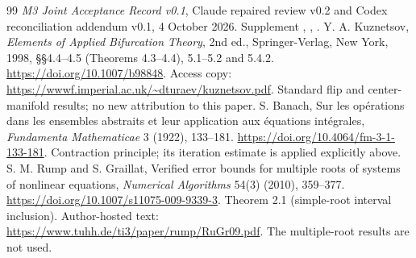 \documentclass[11pt,a4paper]{article}
\begin{document}
\begin{thebibliography}{99}
 \emph{M3 Joint Acceptance Record v0.1}, Claude repaired review v0.2 and Codex reconciliation addendum v0.1, 4 October 2026. Supplement , , .
 Y. A. Kuznetsov, \emph{Elements of Applied Bifurcation Theory}, 2nd ed., Springer-Verlag, New York, 1998, \S\S4.4--4.5 (Theorems 4.3--4.4), 5.1--5.2 and 5.4.2. \url{https://doi.org/10.1007/b98848}. Access copy: \url{https://wwwf.imperial.ac.uk/~dturaev/kuznetsov.pdf}. Standard flip and center-manifold results; no new attribution to this paper.
 S. Banach, Sur les opérations dans les ensembles abstraits et leur application aux équations intégrales, \emph{Fundamenta Mathematicae} 3 (1922), 133--181. \url{https://doi.org/10.4064/fm-3-1-133-181}. Contraction principle; its iteration estimate is applied explicitly above.
 S. M. Rump and S. Graillat, Verified error bounds for multiple roots of systems of nonlinear equations, \emph{Numerical Algorithms} 54(3) (2010), 359--377. \url{https://doi.org/10.1007/s11075-009-9339-3}. Theorem 2.1 (simple-root interval inclusion). Author-hosted text: \url{https://www.tuhh.de/ti3/paper/rump/RuGr09.pdf}. The multiple-root results are not used.
\end{thebibliography}
\end{document}
